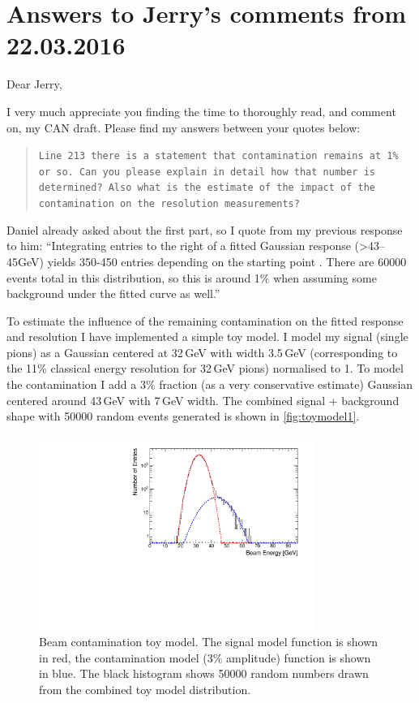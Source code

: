 \documentclass[twoside,a4paper,12pt]{article}
\begin{document}




\section*{Answers to Jerry's comments from 22.03.2016}
Dear Jerry,

I very much appreciate you finding the time to thoroughly read, and comment on, my CAN draft.
Please find my answers between your quotes below:

\begin{quote}\texttt{Line 213 there is a statement that contamination remains at 1\% or so. Can you please explain in detail how that number is determined?  Also what is the estimate of the impact of the contamination on the resolution measurements?}\end{quote}
Daniel already asked about the first part, so I quote from my previous response to him:
``Integrating entries to the right of a fitted Gaussian response (\textgreater 43--45GeV) yields 350-450 entries depending on the starting point . There are 60000 events total in this distribution, so this is around  1\% when assuming some background under the fitted curve as well.''

To estimate the influence of the remaining contamination on the fitted response and resolution I have implemented a simple toy model. I model my signal (single pions) as a Gaussian centered at 32\,GeV with width 3.5\,GeV (corresponding to the 11\% classical energy resolution for 32\,GeV pions) normalised to 1. To model the contamination I add a 3\% fraction (as a very conservative estimate) Gaussian centered around 43\,GeV with 7\,GeV width. The combined signal + background shape with 50000 random events generated is shown in \autoref{fig:toymodel1}.
 \begin{figure}[htbp]
\begin{center}
\includegraphics[width=0.8\textwidth,page=1]{toyModel}
\caption{Beam contamination toy model. The signal model function is shown in red, the contamination model (3\% amplitude) function is shown in blue. The black histogram shows 50000 random numbers drawn from the combined toy model distribution.}
\label{fig:toymodel1}
\end{center}
\end{figure}
\end{document}
